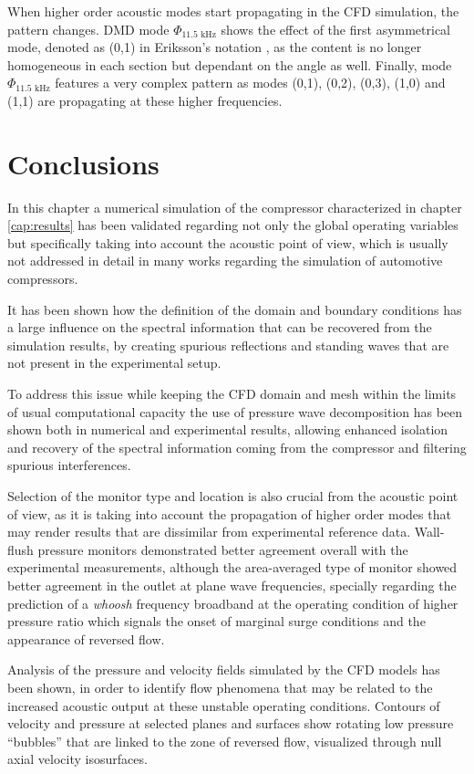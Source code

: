 When higher order acoustic modes start propagating in the CFD simulation, the pattern changes. DMD mode $\Phi_\text{11.5 kHz}$ shows the effect of the first asymmetrical mode, denoted as (0,1) in Eriksson's notation \cite{eriksson1980higher}, as the content is no longer homogeneous in each section but dependant on the angle as well. Finally, mode $\Phi_\text{11.5 kHz}$ features a very complex pattern as modes (0,1), (0,2), (0,3), (1,0) and (1,1) are propagating at these higher frequencies.

\section{Conclusions}

In this chapter a numerical simulation of the compressor characterized in chapter \ref{cap:results} has been validated regarding not only the global operating variables but specifically taking into account the acoustic point of view, which is usually not addressed in detail in many works regarding the simulation of automotive compressors.

It has been shown how the definition of the domain and boundary conditions has a large influence on the spectral information that can be recovered from the simulation results, by creating spurious reflections and standing waves that are not present in the experimental setup.

To address this issue while keeping the CFD domain and mesh within the limits of usual computational capacity the use of pressure wave decomposition has been shown both in numerical and experimental results, allowing enhanced isolation and recovery of the spectral information coming from the compressor and filtering spurious interferences.

Selection of the monitor type and location is also crucial from the acoustic point of view, as it is taking into account the propagation of higher order modes that may render results that are dissimilar from experimental reference data. Wall-flush pressure monitors demonstrated better agreement overall with the experimental measurements, although the area-averaged type of monitor showed better agreement in the outlet at plane wave frequencies, specially regarding the prediction of a \emph{whoosh} frequency broadband at the operating condition of higher pressure ratio which signals the onset of marginal surge conditions and the appearance of reversed flow.

Analysis of the pressure and velocity fields simulated by the CFD models has been shown, in order to identify flow phenomena that may be related to the increased acoustic output at these unstable operating conditions. Contours of velocity and pressure at selected planes and surfaces show rotating low pressure ``bubbles'' that are linked to the zone of reversed flow, visualized through null axial velocity isosurfaces.


